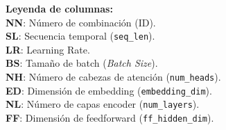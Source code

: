\vspace{0.5em}
\begin{minipage}{0.98\textwidth}
\footnotesize
\textbf{Leyenda de columnas:}  \\
\textbf{NN}: Número de combinación (ID).  \\
\textbf{SL}: Secuencia temporal (\texttt{seq\_len}).  \\
\textbf{LR}: Learning Rate.  \\
\textbf{BS}: Tamaño de batch (\textit{Batch Size}).  \\
\textbf{NH}: Número de cabezas de atención (\texttt{num\_heads}).  \\
\textbf{ED}: Dimensión de embedding (\texttt{embedding\_dim}).  \\
\textbf{NL}: Número de capas encoder (\texttt{num\_layers}).  \\
\textbf{FF}: Dimensión de feedforward (\texttt{ff\_hidden\_dim}). \\
\end{minipage}